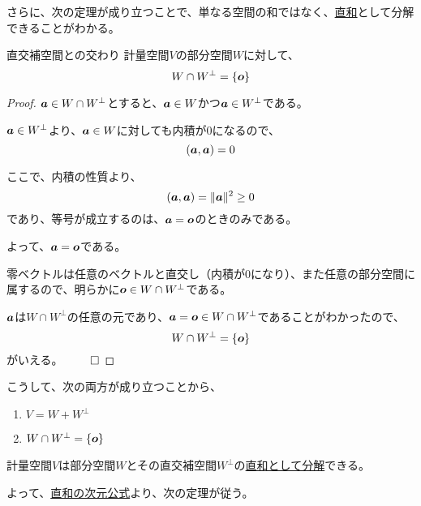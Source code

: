 \documentclass[../../../topic_linear-algebra]{subfiles}
\begin{document}
\br

さらに、次の定理が成り立つことで、単なる空間の和ではなく、\hyperref[def:direct-sum]{直和}として分解できることがわかる。

\begin{theorem}{直交補空間との交わり}
  計量空間$V$の部分空間$W$に対して、
  \begin{equation*}
    W \cap W^\perp = \{ \vb*{o} \}
  \end{equation*}
\end{theorem}

\begin{proof}
  $\vb*{a} \in W \cap W^\perp$とすると、$\vb*{a} \in W$かつ$\vb*{a} \in W^\perp$である。

  $\vb*{a} \in W^\perp$より、$\vb*{a} \in W$に対しても内積が0になるので、
  \begin{equation*}
    (\vb*{a}, \vb*{a}) = 0
  \end{equation*}

  ここで、内積の性質より、
  \begin{equation*}
    (\vb*{a}, \vb*{a}) = \| \vb*{a} \|^2 \geq 0
  \end{equation*}
  であり、等号が成立するのは、$\vb*{a} = \vb*{o}$のときのみである。

  よって、$\vb*{a} = \vb*{o}$である。

  \br

  零ベクトルは任意のベクトルと直交し（内積が0になり）、また任意の部分空間に属するので、明らかに$\vb*{o} \in W \cap W^\perp$である。

  \br

  $\vb*{a}$は$W \cap W^\perp$の任意の元であり、$\vb*{a} = \vb*{o} \in W \cap W^\perp$であることがわかったので、
  \begin{equation*}
    W \cap W^\perp = \{ \vb*{o} \}
  \end{equation*}
  がいえる。 $\qed$
\end{proof}

\br

こうして、次の両方が成り立つことから、
\begin{enumerate}[label=\romanlabel]
  \item $V = W + W^\perp$
  \item $W \cap W^\perp = \{ \vb*{o} \}$
\end{enumerate}
計量空間$V$は部分空間$W$とその直交補空間$W^\perp$の\hyperref[thm:direct-sum-equiv]{直和として分解}できる。

\br

よって、\hyperref[thm:dim-direct-sum]{直和の次元公式}より、次の定理が従う。
\end{document}
